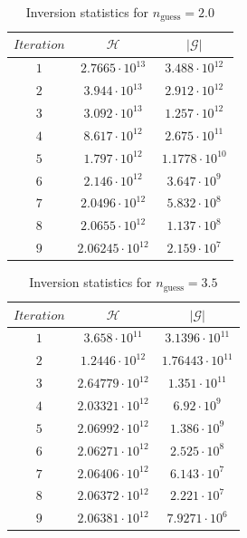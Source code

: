 \documentclass[12pt]{article}
\begin{document}
\begin{table}[H]
		\caption{Inversion statistics for $n_{\text{guess}}= 2.0$} %
		\centering  %
		\begin{tabular}{c c c } %
		\hline \hline                        %
 		$Iteration$&$\mathcal H$ &$|\mathcal G|$   \\ [0.5ex] %
		\hline                  %
                $1$&$2.7665\cdot 10^{13}$&$3.488\cdot 10^{12}$   \\
		$2$&$3.944\cdot 10^{13}$&$2.912\cdot 10^{12}$   \\
                $3$&$3.092\cdot 10^{13}$&$1.257\cdot 10^{12}$   \\
		$4$&$8.617\cdot 10^{12}$&$2.675\cdot 10^{11}$   \\
		$5$&$1.797\cdot 10^{12}$&$1.1778\cdot 10^{10}$   \\
		$6$&$2.146\cdot 10^{12}$&$3.647\cdot 10^{9}$   \\
		$7$&$2.0496\cdot 10^{12}$&$5.832\cdot 10^{8}$   \\
 		$8$&$2.0655\cdot 10^{12}$&$1.137\cdot 10^{8}$   \\
		$9$&$2.06245\cdot 10^{12}$&$2.159\cdot 10^{7}$   \\
                \hline %
		\end{tabular}
		\label{table:gradcheck4} %
		\end{table}


\begin{table}[H]
		\caption{Inversion statistics for $n_{\text{guess}}= 3.5$} %
		\centering  %
		\begin{tabular}{c c c } %
		\hline \hline                        %
 		$Iteration$&$\mathcal H$ &$|\mathcal G|$   \\ [0.5ex] %
		\hline                  %
                $1$&$3.658\cdot 10^{11}$&$3.1396\cdot 10^{11}$   \\
		$2$&$1.2446\cdot 10^{12}$&$1.76443\cdot 10^{11}$   \\
                $3$&$2.64779\cdot 10^{12}$&$1.351\cdot 10^{11}$   \\
		$4$&$2.03321\cdot 10^{12}$&$6.92\cdot 10^{9}$   \\
		$5$&$2.06992\cdot 10^{12}$&$1.386\cdot 10^{9}$   \\
		$6$&$2.06271\cdot 10^{12}$&$2.525\cdot 10^{8}$   \\
		$7$&$2.06406\cdot 10^{12}$&$6.143\cdot 10^{7}$   \\
 		$8$&$2.06372\cdot 10^{12}$&$2.221\cdot 10^{7}$   \\
		$9$&$2.06381\cdot 10^{12}$&$7.9271\cdot 10^{6}$   \\
                \hline %
		\end{tabular}
		\label{table:gradcheck5} %
		\end{table}
        
\end{document}

